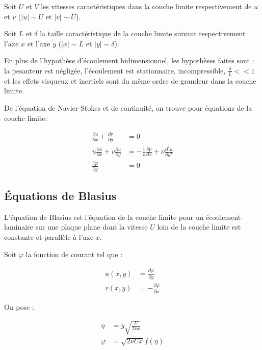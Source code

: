 Soit $U$ et $V$ les vitesses caractéristiques dans la couche limite respectivement de $u$ et $v$ ($\left| u \right| \sim U$ et $\left| v \right| \sim U$).

Soit $L$ et $\delta$ la taille caractéristique de la couche limite suivant respectivement l'axe $x$ et l'axe $y$ ($\left| x \right| \sim L$ et $\left| y \right| \sim \delta$).

En plus de l'hypothèse d'écoulement bidimensionnel, les hypothèses faites sont : la pesanteur est négligée, l'écoulement est stationnaire, incompressible, $\frac{\delta}{L} << 1$ et les effets visqueux et inertiels sont du même ordre de grandeur dans la couche limite.


De l'équation de Navier-Stokes et de continuité, on trouve pour équations de la couche limite:

\begin{align}	
	\frac{\partial u}{\partial x} 
	+
	\frac{\partial v}{\partial y} 
	&= 0 \\
	u\frac{\partial u}{\partial x} + 
	v\frac{\partial u}{\partial y} 
	&= - \frac{1}{\rho}
	\frac{\partial p}{\partial  x} +
	\nu
	\frac{\partial^{2} u}{\partial  y^{2}} \\
	\frac{\partial p}{\partial y} 
	&= 0
\end{align}
\subsection{Équations de Blasius}
L'équation de Blasius est l'équation de la couche limite pour un écoulement laminaire sur une plaque plane dont la vitesse $U$ loin de la couche limite est constante et parallèle à l'axe $x$.

Soit $\varphi$ la fonction de courant tel que :

\begin{align*}
	u(x,y) &= 
	\frac{\partial \varphi}{\partial y} \\
	v(x,y) &= - 
	\frac{\partial \varphi}{\partial x}
\end{align*}

On pose :

\begin{align*}
	\eta &= y \sqrt{\frac{U}{2\nu x }} \\
	\varphi &= \sqrt{2\nu U x} f(\eta)
\end{align*}


